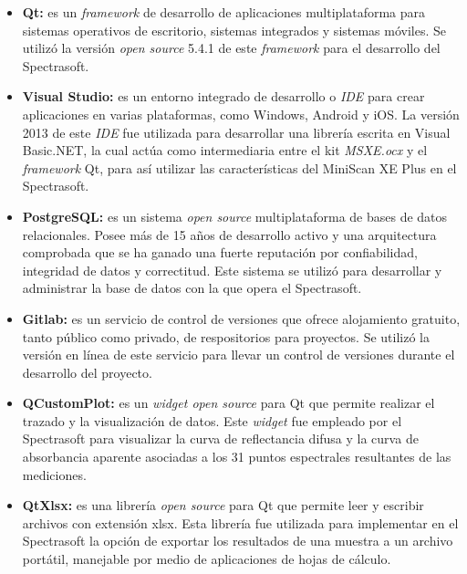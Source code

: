 		\begin{itemize}
			
			\item \textbf{Qt:} es un \textit{framework} de desarrollo de aplicaciones multiplataforma para sistemas operativos de escritorio, sistemas integrados y sistemas m\'{o}viles. Se utiliz\'{o} la versi\'{o}n \textit{open source} 5.4.1 de este \textit{framework} para el desarrollo del Spectrasoft.
			
			\item \textbf{Visual Studio:} es un entorno integrado de desarrollo o \textit{IDE} para crear aplicaciones en varias plataformas, como Windows, Android y iOS. La versi\'{o}n 2013 de este \textit{IDE} fue utilizada para desarrollar una librer\'{i}a escrita en Visual Basic.NET, la cual act\'{u}a como intermediaria entre el kit \textit{MSXE.ocx} y el \textit{framework} Qt, para as\'{i} utilizar las caracter\'{i}sticas del MiniScan XE Plus en el Spectrasoft.
			
			\item \textbf{PostgreSQL:} es un sistema \textit{open source} multiplataforma de bases de datos relacionales. Posee m\'{a}s de 15 a\~{n}os de desarrollo activo y una arquitectura comprobada que se ha ganado una fuerte reputaci\'{o}n por confiabilidad, integridad de datos y correctitud. Este sistema se utiliz\'{o} para desarrollar y administrar la base de datos con la que opera el Spectrasoft.
			
			\item \textbf{Gitlab:} es un servicio de control de versiones que ofrece alojamiento gratuito, tanto p\'{u}blico como privado, de respositorios para proyectos. Se utiliz\'{o} la versi\'{o}n en l\'{i}nea de este servicio para llevar un control de versiones durante el desarrollo del proyecto.
			
			\item \textbf{QCustomPlot:} es un \textit{widget open source} para Qt que permite realizar el trazado y la visualizaci\'{o}n de datos. Este \textit{widget} fue empleado por el Spectrasoft para visualizar la curva de reflectancia difusa y la curva de absorbancia aparente asociadas a los 31 puntos espectrales resultantes de las mediciones.
			
			\item \textbf{QtXlsx:} es una librer\'{i}a \textit{open source} para Qt que permite leer y escribir archivos con extensi\'{o}n xlsx. Esta librer\'{i}a fue utilizada para implementar en el Spectrasoft la opci\'{o}n de exportar los resultados de una muestra a un archivo port\'{a}til, manejable por medio de aplicaciones de hojas de c\'{a}lculo.
		\end{itemize}
	
